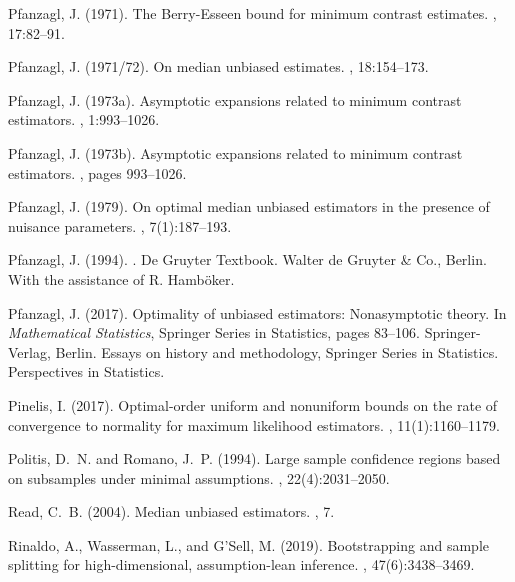 \documentclass{article}
\numberwithin{myalgctr}{section}
\begin{document}
\begin{thebibliography}{}
Pfanzagl, J. (1971).
\newblock The {B}erry-{E}sseen bound for minimum contrast estimates.
, 17:82--91.

Pfanzagl, J. (1971/72).
\newblock On median unbiased estimates.
, 18:154--173.

Pfanzagl, J. (1973a).
\newblock Asymptotic expansions related to minimum contrast estimators.
, 1:993--1026.

Pfanzagl, J. (1973b).
\newblock Asymptotic expansions related to minimum contrast estimators.
, pages 993--1026.

Pfanzagl, J. (1979).
\newblock On optimal median unbiased estimators in the presence of nuisance
  parameters.
, 7(1):187--193.

Pfanzagl, J. (1994).
.
\newblock De Gruyter Textbook. Walter de Gruyter \& Co., Berlin.
\newblock With the assistance of R. Hamb\"{o}ker.

Pfanzagl, J. (2017).
\newblock Optimality of unbiased estimators: Nonasymptotic theory.
\newblock In {\em Mathematical Statistics}, Springer Series in Statistics,
  pages 83--106. Springer-Verlag, Berlin.
\newblock Essays on history and methodology, Springer Series in Statistics.
  Perspectives in Statistics.

Pinelis, I. (2017).
\newblock Optimal-order uniform and nonuniform bounds on the rate of
  convergence to normality for maximum likelihood estimators.
, 11(1):1160--1179.

Politis, D.~N. and Romano, J.~P. (1994).
\newblock Large sample confidence regions based on subsamples under minimal
  assumptions.
, 22(4):2031--2050.

Read, C.~B. (2004).
\newblock Median unbiased estimators.
, 7.

Rinaldo, A., Wasserman, L., and G'Sell, M. (2019).
\newblock Bootstrapping and sample splitting for high-dimensional,
  assumption-lean inference.
, 47(6):3438--3469.


\end{thebibliography}
\end{document}
